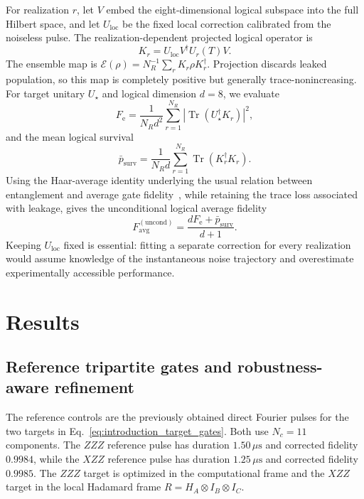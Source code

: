 \documentclass[
  aps,
  pra,
  reprint,            %
  superscriptaddress, %
  amsmath,amssymb,
  notitlepage
]{revtex4-2}
\begin{document}
For realization $r$, let $V$ embed the eight-dimensional logical subspace into the full Hilbert space, and let $U_{\mathrm{loc}}$ be the fixed local correction calibrated from the noiseless pulse. The realization-dependent projected logical operator is
\begin{equation}
K_r
=
U_{\mathrm{loc}}V^\dagger U_r(T)V.
\label{eq:noisy_logical_kraus}
\end{equation}
The ensemble map is $\mathcal E(\rho)=N_R^{-1}\sum_rK_r\rho K_r^\dagger$. Projection discards leaked population, so this map is completely positive but generally trace-nonincreasing. For target unitary $U_\star$ and logical dimension $d=8$, we evaluate
\begin{equation}
F_{\mathrm e}
=
\frac{1}{N_Rd^2}
\sum_{r=1}^{N_R}
\left|\operatorname{Tr}(U_\star^\dagger K_r)\right|^2,
\label{eq:ensemble_entanglement_fidelity}
\end{equation}
and the mean logical survival
\begin{equation}
\bar p_{\mathrm{surv}}
=
\frac{1}{N_Rd}
\sum_{r=1}^{N_R}
\operatorname{Tr}(K_r^\dagger K_r).
\label{eq:ensemble_survival}
\end{equation}
Using the Haar-average identity underlying the usual relation between entanglement and average gate fidelity~\cite{nielsen2002average}, while retaining the trace loss associated with leakage, gives the unconditional logical average fidelity
\begin{equation}
F_{\mathrm{avg}}^{(\mathrm{uncond})}
=
\frac{dF_{\mathrm e}+\bar p_{\mathrm{surv}}}{d+1}.
\label{eq:ensemble_average_gate_fidelity}
\end{equation}
Keeping $U_{\mathrm{loc}}$ fixed is essential: fitting a separate correction for every realization would assume knowledge of the instantaneous noise trajectory and overestimate experimentally accessible performance.

\section{Results}
\label{sec:results}

\subsection{Reference tripartite gates and robustness-aware refinement}
\label{subsec:tripartite_gate_synthesis}

The reference controls are the previously obtained direct Fourier pulses for the two targets in Eq.~\eqref{eq:introduction_target_gates}. Both use $N_c=11$ components. The $ZZZ$ reference pulse has duration $1.50\,\mu\mathrm{s}$ and corrected fidelity $0.9984$, while the $XZZ$ reference pulse has duration $1.25\,\mu\mathrm{s}$ and corrected fidelity $0.9985$. The $ZZZ$ target is optimized in the computational frame and the $XZZ$ target in the local Hadamard frame $R=H_A\otimes I_B\otimes I_C$.
\end{document}
